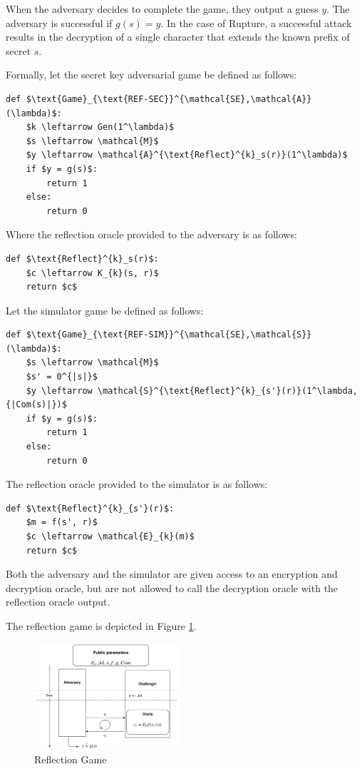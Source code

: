 When the adversary decides to complete the game, they output a guess $y$. The
adversary is successful if $g(s) = y$. In the case of Rupture, a successful
attack results in the decryption of a single character that extends the known
prefix of secret $s$.

Formally, let the secret key adversarial game be defined as follows:

\begin{lstlisting}[texcl,mathescape,basicstyle=\small]
def $\text{Game}_{\text{REF-SEC}}^{\mathcal{SE},\mathcal{A}}(\lambda)$:
    $k \leftarrow Gen(1^\lambda)$
    $s \leftarrow \mathcal{M}$
    $y \leftarrow \mathcal{A}^{\text{Reflect}^{k}_s(r)}(1^\lambda)$
    if $y = g(s)$:
        return 1
    else:
        return 0
\end{lstlisting}

Where the reflection oracle provided to the adversary is as follows:

\begin{lstlisting}[texcl,mathescape,basicstyle=\small]
def $\text{Reflect}^{k}_s(r)$:
    $c \leftarrow K_{k}(s, r)$
    return $c$
\end{lstlisting}

Let the simulator game be defined as follows:

\begin{lstlisting}[texcl,mathescape,basicstyle=\small]
def $\text{Game}_{\text{REF-SIM}}^{\mathcal{SE},\mathcal{S}}(\lambda)$:
    $s \leftarrow \mathcal{M}$
    $s' = 0^{|s|}$
    $y \leftarrow \mathcal{S}^{\text{Reflect}^{k}_{s'}(r)}(1^\lambda, {|Com(s)|})$
    if $y = g(s)$:
        return 1
    else:
        return 0
\end{lstlisting}

The reflection oracle provided to the simulator is as follows:

\begin{lstlisting}[texcl,mathescape,basicstyle=\small]
def $\text{Reflect}^{k}_{s'}(r)$:
    $m = f(s', r)$
    $c \leftarrow \mathcal{E}_{k}(m)$
    return $c$
\end{lstlisting}

Both the adversary and the simulator are given access to an encryption and decryption oracle, but
are not allowed to call the decryption oracle with the reflection oracle output.

The reflection game is depicted in Figure \ref{fig:refgame}.

    \begin{figure}[thpb]
        \centering
            \includegraphics[width=0.48\textwidth]{figures/reflection_game.png}
        \caption{Reflection Game}
        \label{fig:refgame}
    \end{figure}

